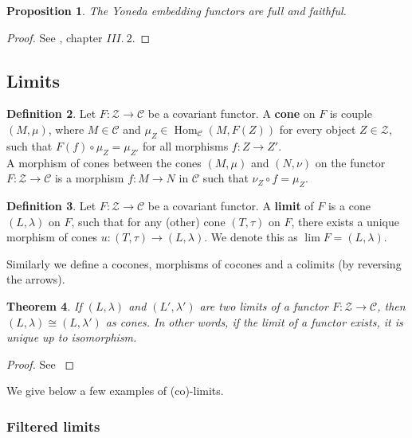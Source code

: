 \documentclass{article}
\theoremstyle{plain}
\newtheorem{theorem}{Theorem}[subsection]
\newtheorem{proposition}[theorem]{Proposition}
\theoremstyle{definition}
\newtheorem{definition}[theorem]{Definition}
\DeclareMathOperator{\Hom}{Hom}
\DeclareMathOperator{\Lim}{lim}
\begin{document}
\begin{proposition}
\label{yoneda_embeddings}
    The Yoneda embedding functors are full and faithful.
\end{proposition}
\begin{proof}
    See \cite{McLane_Sau}, chapter $III. \: 2.$
\end{proof}


\subsection{Limits}
\begin{definition}
    Let $F : \mathcal{Z} \rightarrow\mathcal{C}$ be a covariant functor. A \textbf{cone} on $F$ is couple $(M,\mu)$, where $M\in \mathcal{C}$ and $\mu_Z \in \Hom_{\mathcal{C}}(M, F(Z))$ for every object $Z\in \mathcal{Z}$, such that $F(f) \circ \mu_Z = \mu_{Z'}$ for all morphisms $f : Z \rightarrow Z'$.\\
    A morphism of cones between the cones $(M,\mu)$ and $(N,\nu)$ on the functor $F : \mathcal{Z}\rightarrow\mathcal{C}$ is a morphism $f : M \rightarrow N$ in $\mathcal{C}$ such that $\nu_Z \circ f=\mu_Z$.
\end{definition}

\begin{definition}
    Let $F : \mathcal{Z}\rightarrow\mathcal{C}$ be a covariant functor. A \textbf{limit} of $F$ is a cone $(L,\lambda)$ on $F$, such that for any (other) cone $(T,\tau)$ on $F$, there exists a unique morphism of cones $u: (T,\tau) \rightarrow (L,\lambda)$. We denote this as $\Lim F = (L,\lambda)$.
\end{definition}

\noindent Similarly we define a cocones, morphisms of cocones and a colimits (by reversing the arrows).

\begin{theorem}
    If $(L,\lambda)$ and $(L',\lambda')$ are two limits of a functor $F : \mathcal{Z}\rightarrow\mathcal{C}$, then $(L,\lambda)\cong(L,\lambda')$ as cones. In other words, if the limit of a functor exists, it is unique up to isomorphism.
\end{theorem}
\begin{proof}
    See \cite{McLane_Sau}
\end{proof}

\noindent We give below a few examples of (co)-limits.


\subsubsection*{Filtered limits}
\end{document}
